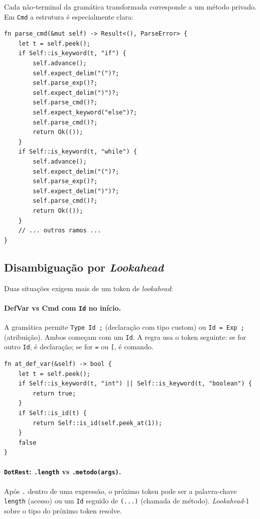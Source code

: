 \documentclass[12pt,a4paper]{article}
\begin{document}
Cada não-terminal da gramática transformada corresponde a um método
privado. Em \texttt{Cmd} a estrutura é especialmente clara:

\begin{lstlisting}[caption={Trecho de \texttt{parse\_cmd}}]
fn parse_cmd(&mut self) -> Result<(), ParseError> {
    let t = self.peek();
    if Self::is_keyword(t, "if") {
        self.advance();
        self.expect_delim("(")?;
        self.parse_exp()?;
        self.expect_delim(")")?;
        self.parse_cmd()?;
        self.expect_keyword("else")?;
        self.parse_cmd()?;
        return Ok(());
    }
    if Self::is_keyword(t, "while") {
        self.advance();
        self.expect_delim("(")?;
        self.parse_exp()?;
        self.expect_delim(")")?;
        self.parse_cmd()?;
        return Ok(());
    }
    // ... outros ramos ...
}
\end{lstlisting}

\subsection{Disambiguação por \emph{Lookahead}}

Duas situações exigem mais de um token de \emph{lookahead}:

\paragraph{DefVar vs Cmd com \texttt{Id} no início.} A gramática
permite \texttt{Type Id ;} (declaração com tipo custom) ou
\texttt{Id = Exp ;} (atribuição). Ambos começam com um \texttt{Id}.
A regra usa o token seguinte: se for outro \texttt{Id}, é
declaração; se for \texttt{=} ou \texttt{[}, é comando.

\begin{lstlisting}[caption={Discriminação por \emph{lookahead}-2}]
fn at_def_var(&self) -> bool {
    let t = self.peek();
    if Self::is_keyword(t, "int") || Self::is_keyword(t, "boolean") {
        return true;
    }
    if Self::is_id(t) {
        return Self::is_id(self.peek_at(1));
    }
    false
}
\end{lstlisting}

\paragraph{\texttt{DotRest}: \texttt{.length} vs \texttt{.metodo(args)}.}
Após \verb|.| dentro de uma expressão, o próximo token pode ser a
palavra-chave \texttt{length} (acesso) ou um \texttt{Id} seguido de
\verb|(...)| (chamada de método). \emph{Lookahead}-1 sobre o tipo do
próximo token resolve.
\end{document}
